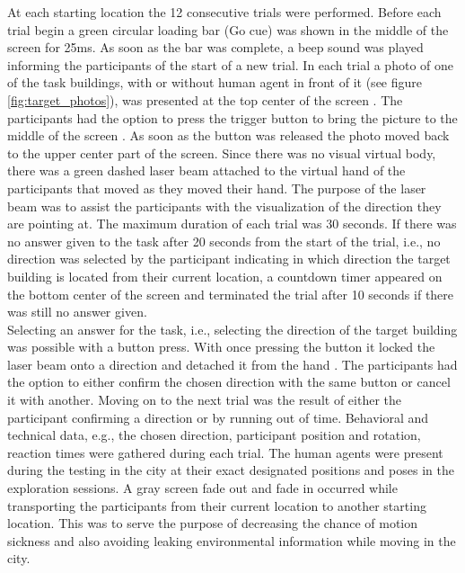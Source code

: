 At each starting location the 12 consecutive trials were performed. Before each trial begin a green circular loading bar {\emphasize (Go cue)} was shown in the middle of the screen for 25ms. As soon as the bar was complete, a beep sound was played informing the participants of the start of a new trial. In each trial a photo of one of the task buildings, with or without human agent in front of it (see figure \ref{fig:target_photos}), was presented at the top center of the screen . The participants had the option to press the trigger button to bring the picture to the middle of the screen . As soon as the button was released the photo moved back to the upper center part of the screen. Since there was no visual virtual body, there was a green dashed laser beam  attached to the virtual hand of the participants that moved as they moved their hand. The purpose of the laser beam was to assist the participants with the visualization of the direction they are pointing at. The maximum duration of each trial was 30 seconds. If there was no answer given to the task after 20 seconds from the start of the trial, i.e., no direction was selected by the participant indicating in which direction the target building is located from their current location, a countdown timer appeared on the bottom center of the screen  and terminated the trial after 10 seconds if there was still no answer given. \\

Selecting an answer for the task, i.e., selecting the direction of the target building was possible with a button press. With once pressing the button it locked the laser beam onto a direction and detached it from the hand . The participants had the option to either confirm the chosen direction with the same button or cancel it with another. Moving on to the next trial was the result of either the participant confirming a direction or by running out of time. Behavioral and technical data, e.g., the chosen direction, participant position and rotation, reaction times were gathered during each trial. The human agents were present during the testing in the city at their exact designated positions and poses in the exploration sessions. A gray screen fade out and fade in occurred while transporting the participants from their current location to another starting location. This was to serve the purpose of decreasing the chance of motion sickness and also avoiding leaking environmental information while moving in the city.

